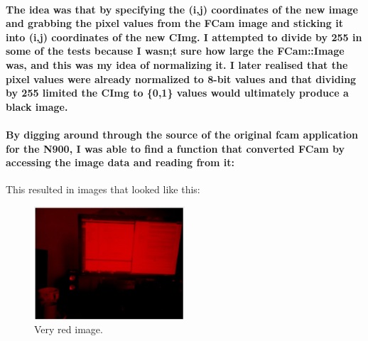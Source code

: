 \documentclass[11pt]{article} %
\begin{document}
\paragraph{The idea was that by specifying the (i,j) coordinates of the new image and grabbing the pixel values from the FCam image and sticking it into (i,j) coordinates of the new CImg. I attempted to divide by 255 in some of the tests because I wasn;t sure how large the FCam::Image was, and this was my idea of normalizing it. I later realised that the pixel values were already normalized to 8-bit values and that dividing by 255 limited the CImg to \{0,1\} values would ultimately produce a black image.}
\paragraph{By digging around through the source of the original fcam application for the N900, I was able to find a function that converted FCam by accessing the image data and reading from it:}
\begin{frame}[fragile]

\end{frame}
This resulted in images that looked like this:
\begin{center}
\begin{figure}
	\vspace{-20pt}
	\hspace{70pt}
		\includegraphics[width=0.5\textwidth]{../images/redbuffer1}
	\vspace{-20pt}
	\caption{Very red image.}
\end{figure}
\end{center}
\end{document}
